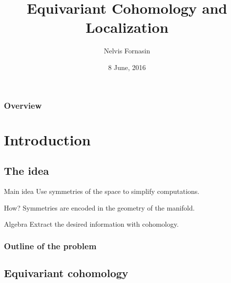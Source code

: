 \documentclass{beamer}
\title[Localization]{Equivariant Cohomology and Localization} %
\author{Nelvis Fornasin} %
\institute[LMU] %
{
Ludwig-Maximilians-Universit\"at M\"unchen  \\ %
\medskip
}
\date{8 June, 2016} %
\begin{document}
\begin{frame}
\titlepage %
\end{frame}

\begin{frame}
\frametitle{Overview} %
\tableofcontents %
\end{frame}


\section{Introduction} %

\subsection{The idea}
\begin{frame}
\begin{block}{Main idea}
Use symmetries of the space to simplify computations.
\end{block}
\begin{block}{How?}
Symmetries are encoded in the geometry of the manifold.
\end{block}
\begin{block}{Algebra}
Extract the desired information with cohomology.
\end{block}
\frametitle{Outline of the problem}
\end{frame}

\subsection{Equivariant cohomology} %
\end{document}

